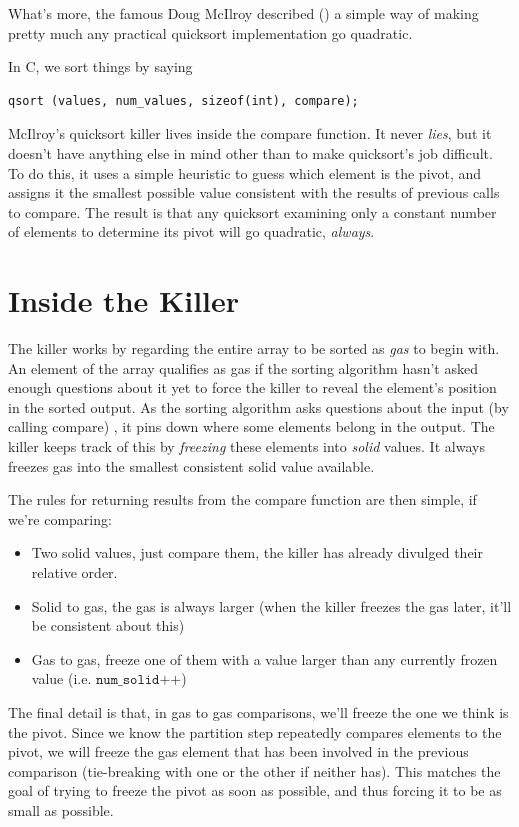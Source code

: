 \documentclass[11pt]{article}
\begin{document}
What's more, the famous Doug McIlroy described (\texttt{}) a simple way of making pretty much any practical quicksort implementation go quadratic.

In C, we sort things by saying
\begin{lstlisting}
qsort (values, num_values, sizeof(int), compare);
\end{lstlisting}

McIlroy's quicksort killer lives inside the compare function. It never \emph{lies}, but it doesn't have anything else in mind other than to make quicksort's job difficult. To do this, it uses a simple heuristic to guess which element is the pivot, and assigns it the smallest possible value consistent with the results of previous calls to compare. The result is that any quicksort examining only a constant number of elements to determine its pivot will go quadratic, \emph{always}.
\section{Inside the Killer}

The killer works by regarding the entire array to be sorted as \emph{gas} to begin with. An element of the array qualifies as gas if the sorting algorithm hasn't asked enough questions about it yet to force the killer to reveal the element's position in the sorted output. As the sorting algorithm asks questions about the input (by calling compare) , it pins down where some elements belong in the output. The killer keeps track of this by \emph{freezing} these elements into \emph{solid} values. It always freezes gas into the smallest consistent solid value available.

The rules for returning results from the compare function are then simple, if we're comparing:
\begin{itemize}
\item Two solid values, just compare them, the killer has already divulged their relative order.
\item Solid to gas, the gas is always larger (when the killer freezes the gas later, it'll be consistent about this)
\item Gas to gas, freeze one of them with a value larger than any currently frozen value (i.e. $\texttt{num\_solid++}$)
\end{itemize}

The final detail is that, in gas to gas comparisons, we'll freeze the one we think is the pivot. Since we know the partition step repeatedly compares elements to the pivot, we will freeze the gas element that has been involved in the previous comparison (tie-breaking with one or the other if neither has). This matches the goal of trying to freeze the pivot as soon as possible, and thus forcing it to be as small as possible.
\end{document}
